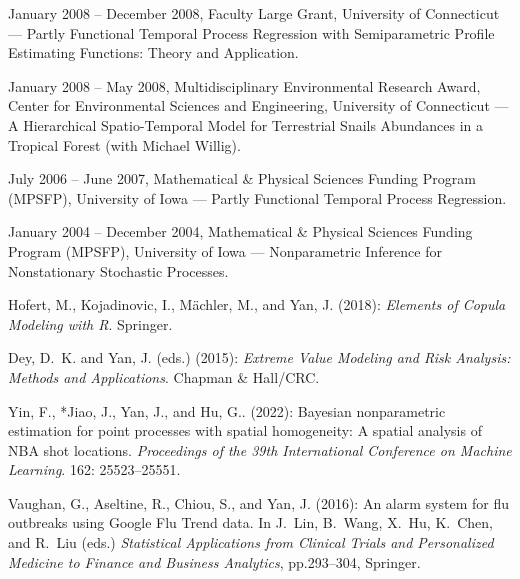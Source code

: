 \documentclass[Statistics]{vita}
\begin{document}
\begin{vita}
\begin{Grants}
\begin{Internal}
  \item January 2008 -- December 2008, Faculty Large Grant, University of Connecticut --- Partly Functional Temporal Process Regression with Semiparametric Profile Estimating Functions: Theory and Application.
  \item January 2008 -- May 2008, Multidisciplinary Environmental Research Award, Center for Environmental Sciences and Engineering, University of Connecticut --- A Hierarchical Spatio-Temporal Model for Terrestrial Snails Abundances in a Tropical Forest (with Michael Willig).
  \item July 2006 -- June 2007, Mathematical \& Physical Sciences Funding Program (MPSFP), University of Iowa --- Partly Functional Temporal Process Regression.
  \item January 2004 -- December 2004, Mathematical \& Physical Sciences Funding Program (MPSFP), University of Iowa --- Nonparametric Inference for Nonstationary Stochastic Processes.
  \end{Internal}
\end{Grants}
\begin{Publications}
%   
%      
  \begin{Books}
  \item Hofert, M., Kojadinovic, I., M\"achler, M., and Yan, J. (2018): {\em Elements of Copula Modeling with R\/}. Springer. 
  \item Dey, D.~K. and Yan, J. (eds.) (2015): {\em Extreme Value Modeling and Risk Analysis: Methods and Applications\/}. Chapman \& Hall/CRC.
  \end{Books}
  \begin{BookChapters}
  \item Yin, F., *Jiao, J., Yan, J., and Hu, G.. (2022): Bayesian nonparametric estimation for point processes with spatial homogeneity: A spatial analysis of NBA shot locations. {\em Proceedings of the 39th International Conference on Machine Learning}. 162: 25523--25551.
  \item *Vaughan, G., Aseltine, R., Chiou, S., and Yan, J. (2016): An alarm system for flu outbreaks using Google Flu Trend data. In J.~Lin, B.~Wang, X.~Hu, K.~Chen, and R.~Liu (eds.) {\em Statistical Applications from Clinical Trials and Personalized Medicine to Finance and Business Analytics}, pp.293--304, Springer.

\end{BookChapters}
\end{Publications}
\end{vita}
\end{document}
